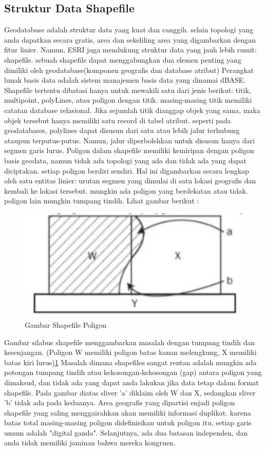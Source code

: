 \subsection{Struktur Data Shapefile}
Geodatabase adalah struktur data yang kuat dan canggih. selain topologi yang anda dapatkan secara gratis, area dan sekeliling area yang
digambarkan dengan fitur linier. Namun, ESRI juga mendukung struktur data yang jauh lebih rumit: shapefile. sebuah shapefile dapat menggabungkan dua elemen penting yang dimiliki oleh geodatabase(komponen geografis dan database atribut) Perangkat lunak 
basis data adalah sistem manajemen basis data yang dinamai dBASE. Shapefile tertentu dibatasi hanya untuk mewakili satu dari jenis berikut: titik, multipoint, polyLines, atau poligon dengan titik. masing-masing titik memiliki catatan database relasional. Jika sejumlah titik dianggap objek yang sama, maka objek tersebut hanya memiliki satu record di tabel atribut. seperti pada geodatabases, polylines dapat disusun dari satu atau lebih jalur terhubung ataupun terputus-putus. Namun, jalur diperbolehkan untuk disusun hanya dari segmen garis lurus. Poligon dalam shapefile memiliki kemiripan dengan poligon basis geodata, namun tidak ada topologi yang ada dan tidak ada yang dapat diciptakan. setiap poligon berdiri sendiri. Hal ini digambarkan secara lengkap oleh satu entitas linier: urutan segmen yang dimulai di satu lokasi geografis dan kembali ke lokasi tersebut. mungkin ada poligon yang berdekatan atau tidak. poligon lain mungkin tumpang tindih. Lihat gambar berikut :
\begin{figure} [ht]
	\centerline{\includegraphics[width=1\textwidth]{figures/shapefilepoligon.JPG}}
	\caption{Gambar Shapefile Poligon}
	\label{shapefilepoligon}
	\end{figure}
Gambar silabus shapefile menggambarkan masalah dengan tumpang tindih dan kesenjangan. (Poligon W memiliki poligon batas kanan melengkung, X memiliki batas kiri lurus)\ref{shapefilepoligon}
Masalah dimana shapefiles sangat rentan adalah mungkin ada potongan tumpang tindih atau kekosongan-kekosongan (gap) antara poligon yang dimaksud, dan tidak ada yang dapat anda lakukan jika data tetap dalam format shapefile. Pada gambar diatas sliver 'a' diklaim oleh W dan X, sedangkan sliver 'b' tidak ada pada keduanya. Area geografis yang dipartisi enjadi poligon shapefile yang saling menggairahkan akan memiliki informasi duplikat. karena batas total masing-masing poligon didefinisikan untuk poligon itu, setiap garis umum adalah "digital ganda". Selanjutnya, ada dua batasan independen, dan anda tidak memiliki jaminan bahwa mereka kongruen.\cite{kennedy2013introducing}

